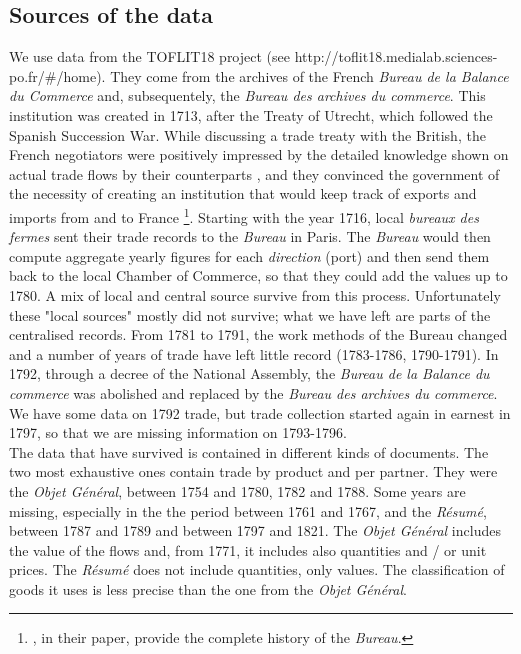\documentclass[12pt,a4paper,notitlepage,english]{article}
\begin{document}
\subsection{Sources of the data} \label{sources_of_data}
We use data from the TOFLIT18 project (see http://toflit18.medialab.sciences-po.fr/\#/home). They come from the archives of the French \textit{Bureau de la Balance du Commerce} and, subsequentely, the \textit{Bureau des archives du commerce}.
This institution was created in 1713, after the Treaty of Utrecht, which followed the Spanish Succession War.
While discussing a trade treaty with the British, the French negotiators were positively impressed by the detailed knowledge shown on actual trade flows by their counterparts , and they convinced the government of the necessity of creating an institution that would keep track of exports and imports from and to France \citep{Charles2011}\footnote{\cite{Charles2011}, in their paper, provide the complete history of the \textit{Bureau}.}.
Starting with the year 1716, local \textit{bureaux des fermes} sent their trade records to the \textit{Bureau} in Paris.
The \textit{Bureau} would then compute aggregate yearly figures for each \textit{direction} (port) and then send them back to the local Chamber of Commerce, so that they could add the values up to 1780.
A mix of local and central source survive from this process. Unfortunately these "local sources" mostly did not survive; what we have left are parts of the centralised records.
From 1781 to 1791, the work methods of the Bureau changed and a number of years of trade have left little record (1783-1786, 1790-1791).
In 1792, through a decree of the National Assembly, the \textit{Bureau de la Balance du commerce} was abolished and replaced by the \textit{Bureau des archives du commerce}. We have some data on 1792 trade, but trade collection started again in earnest in 1797, so that we are missing information on 1793-1796.\\
The data that have survived is contained in different kinds of documents.
The two most exhaustive ones contain trade by product and per partner. They were the \textit{Objet Général}, between 1754 and 1780, 1782 and 1788. Some years are missing, especially in the the period between 1761 and 1767, and the \textit{Résumé}, between 1787 and 1789 and between 1797 and 1821.
The \textit{Objet Général }includes the value of the flows and, from 1771, it includes also quantities and / or unit prices.
The \textit{Résumé} does not include quantities, only values. The classification of goods it uses is less precise than the one from the \textit{Objet Général}.
\end{document}
